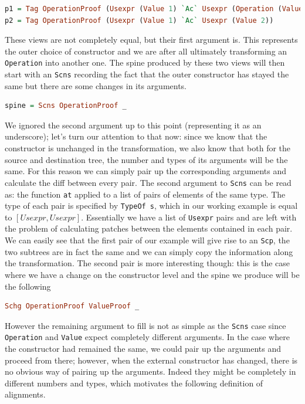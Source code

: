 \documentclass[11pt]{article}
\begin{document}
\begin{lstlisting}[language=haskell]
p1 = Tag OperationProof (Usexpr (Value 1) `Ac` Usexpr (Operation (Value 1) (Value 1)))
p2 = Tag OperationProof (Usexpr (Value 1) `Ac` Usexpr (Value 2))
\end{lstlisting}

These views are not completely equal, but their first argument is. This represents the outer choice 
of constructor and we are after all ultimately transforming an \texttt{Operation} into another one. The spine produced
by these two views will then start with an \texttt{Scns} recording the fact that 
the outer constructor has stayed the same but there are some changes in its 
arguments.

\begin{lstlisting}[language=haskell]
spine = Scns OperationProof _
\end{lstlisting}

We ignored the second argument up to this point (representing it as an underscore); let's turn our attention to 
that now: since we know that the constructor is unchanged in the transformation, we also know that 
both for the source and destination tree, the number and types of its arguments 
will be the same. For this reason we can simply pair up the corresponding 
arguments and calculate the diff between every pair. The second argument to \texttt{Scns} can be read as: the function 
\texttt{at} applied to a list of pairs of elements of the same type. The type of each 
pair is specified by \texttt{TypeOf s}, which in our working example is equal to 
$[Usexpr, Usexpr]$. Essentially we have a list of \texttt{Usexpr} pairs and are 
left with the problem of calculating patches between the elements contained in 
each pair. 
We can easily see that the first pair of our example will give rise to an 
\texttt{Scp}, the two subtrees are in fact the same and we can simply copy the 
information along the transformation. The second pair is more interesting 
though: this is the case where we have a change on the constructor level and the 
spine we produce will be the following
\begin{lstlisting}[language=haskell]
  Schg OperationProof ValueProof _
\end{lstlisting}
However the remaining argument to fill is not as simple as the \texttt{Scns} 
case since \texttt{Operation} and \texttt{Value} expect completely different 
arguments.
In the case where the constructor had remained the same, we could 
pair up the arguments and proceed from there; however, when the
external constructor has changed, there is no obvious way of pairing up
the arguments. Indeed they might be completely in different numbers and types, which 
motivates the following definition of alignments.
\end{document}
